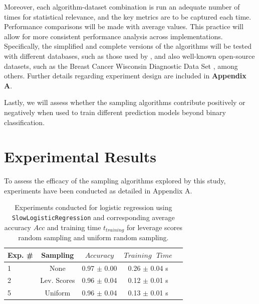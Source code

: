 \documentclass{article}
\theoremstyle{plain}
\theoremstyle{definition}
\theoremstyle{remark}
\begin{document}
Moreover, each algorithm-dataset combination is run an adequate number of times for statistical relevance, and the key metrics are to be captured each time. Performance comparisons will be made with average values. This practice will allow for more consistent performance analysis across implementations. Specifically, the simplified and complete versions of the algorithms will be tested with different databases, such as those used by \citeauthor{chow24}, and also well-known open-source datasets, such as the Breast Cancer Wisconsin Diagnostic Data Set \cite{breastcancer}, among others. Further details regarding experiment design are included in \textbf{Appendix A}.

Lastly, we will assess whether the sampling algorithms contribute positively or negatively when used to train different prediction models beyond binary classification.


\section{Experimental Results}

To assess the efficacy of the sampling algorithms explored by this study, experiments have been conducted as detailed in Appendix A.

\begin{table}[t]
	\caption{Experiments conducted for logistic regression using \texttt{SlowLogisticRegression} and corresponding average accuracy $Acc$ and training time $t_{training}$ for leverage scores random sampling and uniform random sampling.}
	\label{t1}
	\vskip 0.15in
	\begin{center}
		\begin{small}
			\begin{sc}
				\begin{tabular}{lcccr}
					\toprule
					Exp. \# & Sampling & $Accuracy$ & $Training \text{ } Time$\\
					\midrule
					1 & None & 0.97 $\pm$ 0.00 & 0.26 $\pm$ 0.04 s \\
					2 & Lev. Scores & 0.96 $\pm$ 0.04 & 0.12 $\pm$ 0.01 s \\
					5 & Uniform & 0.96 $\pm$ 0.04 & 0.13 $\pm$ 0.01 s \\
					\bottomrule
				\end{tabular}
			\end{sc}
		\end{small}
	\end{center}
	\vskip -0.1in
\end{table}
\end{document}
